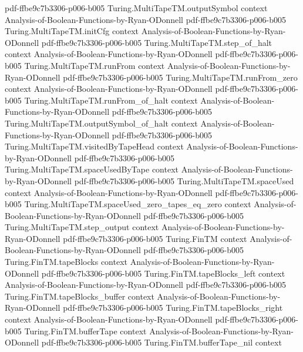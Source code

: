 \begin{lemma}
  {pdf-ffbe9c7b3306-p006-b005}
\proofstep
  {Turing.MultiTapeTM.outputSymbol}
  {context}
  {Analysis-of-Boolean-Functions-by-Ryan-ODonnell}
  {pdf-ffbe9c7b3306-p006-b005}
\proofstep
  {Turing.MultiTapeTM.initCfg}
  {context}
  {Analysis-of-Boolean-Functions-by-Ryan-ODonnell}
  {pdf-ffbe9c7b3306-p006-b005}
\proofstep
  {Turing.MultiTapeTM.step_of_halt}
  {context}
  {Analysis-of-Boolean-Functions-by-Ryan-ODonnell}
  {pdf-ffbe9c7b3306-p006-b005}
\proofstep
  {Turing.MultiTapeTM.runFrom}
  {context}
  {Analysis-of-Boolean-Functions-by-Ryan-ODonnell}
  {pdf-ffbe9c7b3306-p006-b005}
\proofstep
  {Turing.MultiTapeTM.runFrom_zero}
  {context}
  {Analysis-of-Boolean-Functions-by-Ryan-ODonnell}
  {pdf-ffbe9c7b3306-p006-b005}
\proofstep
  {Turing.MultiTapeTM.runFrom_of_halt}
  {context}
  {Analysis-of-Boolean-Functions-by-Ryan-ODonnell}
  {pdf-ffbe9c7b3306-p006-b005}
\proofstep
  {Turing.MultiTapeTM.outputSymbol_of_halt}
  {context}
  {Analysis-of-Boolean-Functions-by-Ryan-ODonnell}
  {pdf-ffbe9c7b3306-p006-b005}
\proofstep
  {Turing.MultiTapeTM.visitedByTapeHead}
  {context}
  {Analysis-of-Boolean-Functions-by-Ryan-ODonnell}
  {pdf-ffbe9c7b3306-p006-b005}
\proofstep
  {Turing.MultiTapeTM.spaceUsedByTape}
  {context}
  {Analysis-of-Boolean-Functions-by-Ryan-ODonnell}
  {pdf-ffbe9c7b3306-p006-b005}
\proofstep
  {Turing.MultiTapeTM.spaceUsed}
  {context}
  {Analysis-of-Boolean-Functions-by-Ryan-ODonnell}
  {pdf-ffbe9c7b3306-p006-b005}
\proofstep
  {Turing.MultiTapeTM.spaceUsed_zero_tapes_eq_zero}
  {context}
  {Analysis-of-Boolean-Functions-by-Ryan-ODonnell}
  {pdf-ffbe9c7b3306-p006-b005}
\proofstep
  {Turing.MultiTapeTM.step_output}
  {context}
  {Analysis-of-Boolean-Functions-by-Ryan-ODonnell}
  {pdf-ffbe9c7b3306-p006-b005}
\proofstep
  {Turing.FinTM}
  {context}
  {Analysis-of-Boolean-Functions-by-Ryan-ODonnell}
  {pdf-ffbe9c7b3306-p006-b005}
\proofstep
  {Turing.FinTM.tapeBlocks}
  {context}
  {Analysis-of-Boolean-Functions-by-Ryan-ODonnell}
  {pdf-ffbe9c7b3306-p006-b005}
\proofstep
  {Turing.FinTM.tapeBlocks_left}
  {context}
  {Analysis-of-Boolean-Functions-by-Ryan-ODonnell}
  {pdf-ffbe9c7b3306-p006-b005}
\proofstep
  {Turing.FinTM.tapeBlocks_buffer}
  {context}
  {Analysis-of-Boolean-Functions-by-Ryan-ODonnell}
  {pdf-ffbe9c7b3306-p006-b005}
\proofstep
  {Turing.FinTM.tapeBlocks_right}
  {context}
  {Analysis-of-Boolean-Functions-by-Ryan-ODonnell}
  {pdf-ffbe9c7b3306-p006-b005}
\proofstep
  {Turing.FinTM.bufferTape}
  {context}
  {Analysis-of-Boolean-Functions-by-Ryan-ODonnell}
  {pdf-ffbe9c7b3306-p006-b005}
\proofstep
  {Turing.FinTM.bufferTape_nil}
  {context}

\end{lemma}
